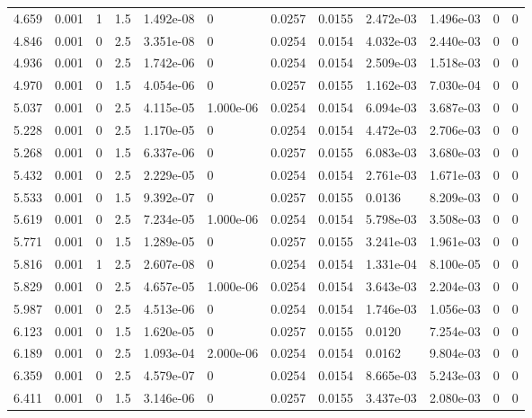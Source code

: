 \documentclass[preview]{standalone}
\begin{document}
{{{\begin{tabular}{L{1.2cm}C{1.2cm} C{0.3cm}C{0.5cm} C{1.4cm}C{1.4cm} C{1.4cm}C{1.4cm} C{1.6cm}C{1.6cm} C{1.6cm}C{1.6cm}}
  4.659  &  0.001  & 1     & 1.5 &  1.492e-08  & 0  &  0.0257&   0.0155& 2.472e-03 & 1.496e-03   &  0 & 0  \\ 
  4.846  &  0.001  & 0     & 2.5 &  3.351e-08  & 0  &  0.0254&   0.0154& 4.032e-03 & 2.440e-03   &  0 & 0  \\ 
  4.936  &  0.001  & 0     & 2.5 &  1.742e-06  & 0  &  0.0254&   0.0154& 2.509e-03 & 1.518e-03   &  0 & 0  \\ 
  4.970  &  0.001  & 0     & 1.5 &  4.054e-06  & 0  &  0.0257&   0.0155& 1.162e-03 & 7.030e-04   &  0 & 0  \\ 
  5.037  &  0.001  & 0     & 2.5 &  4.115e-05  & 1.000e-06  &  0.0254&   0.0154& 6.094e-03 & 3.687e-03   &  0 & 0  \\ 
  5.228  &  0.001  & 0     & 2.5 &  1.170e-05  & 0  &  0.0254&   0.0154& 4.472e-03 & 2.706e-03   &  0 & 0  \\ 
  5.268  &  0.001  & 0     & 1.5 &  6.337e-06  & 0  &  0.0257&   0.0155& 6.083e-03 & 3.680e-03   &  0 & 0  \\ 
  5.432  &  0.001  & 0     & 2.5 &  2.229e-05  & 0  &  0.0254&   0.0154& 2.761e-03 & 1.671e-03   &  0 & 0  \\ 
  5.533  &  0.001  & 0     & 1.5 &  9.392e-07  & 0  &  0.0257&   0.0155& 0.0136 & 8.209e-03   &  0 & 0  \\ 
  5.619  &  0.001  & 0     & 2.5 &  7.234e-05  & 1.000e-06  &  0.0254&   0.0154& 5.798e-03 & 3.508e-03   &  0 & 0  \\ 
  5.771  &  0.001  & 0     & 1.5 &  1.289e-05  & 0  &  0.0257&   0.0155& 3.241e-03 & 1.961e-03   &  0 & 0  \\ 
  5.816  &  0.001  & 1     & 2.5 &  2.607e-08  & 0  &  0.0254&   0.0154& 1.331e-04 & 8.100e-05   &  0 & 0  \\ 
  5.829  &  0.001  & 0     & 2.5 &  4.657e-05  & 1.000e-06  &  0.0254&   0.0154& 3.643e-03 & 2.204e-03   &  0 & 0  \\ 
  5.987  &  0.001  & 0     & 2.5 &  4.513e-06  & 0  &  0.0254&   0.0154& 1.746e-03 & 1.056e-03   &  0 & 0  \\ 
  6.123  &  0.001  & 0     & 1.5 &  1.620e-05  & 0  &  0.0257&   0.0155& 0.0120 & 7.254e-03   &  0 & 0  \\ 
  6.189  &  0.001  & 0     & 2.5 &  1.093e-04  & 2.000e-06  &  0.0254&   0.0154& 0.0162 & 9.804e-03   &  0 & 0  \\ 
  6.359  &  0.001  & 0     & 2.5 &  4.579e-07  & 0  &  0.0254&   0.0154& 8.665e-03 & 5.243e-03   &  0 & 0  \\ 
  6.411  &  0.001  & 0     & 1.5 &  3.146e-06  & 0  &  0.0257&   0.0155& 3.437e-03 & 2.080e-03   &  0 & 0  \\ 

\end{tabular}}}}
\end{document}
